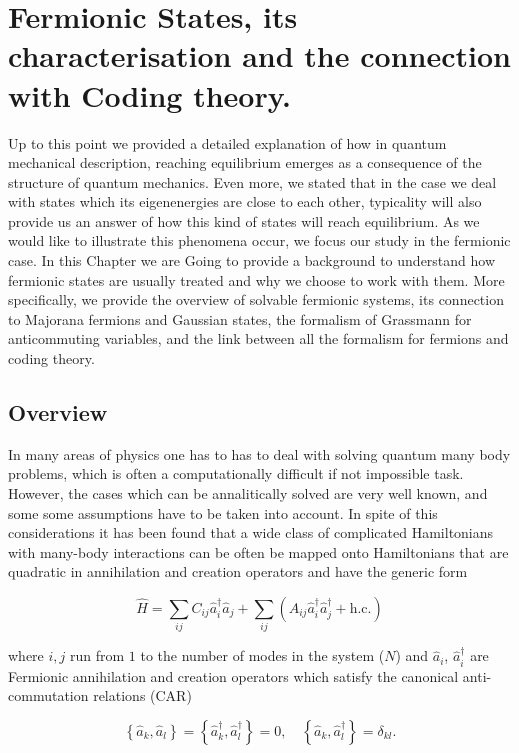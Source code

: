 \chapter{ Fermionic States, its characterisation and the connection with Coding theory.}
Up to this point we provided a detailed explanation of how in quantum mechanical description, reaching equilibrium emerges as a consequence of the structure of quantum mechanics. Even more, we stated that in the case we deal with states which its eigenenergies are close to each other, typicality will also provide us an answer of how this kind of states will reach equilibrium. As we would like to illustrate this phenomena occur, we focus our study in the fermionic case. In this Chapter we are Going to provide a background to understand how fermionic states are usually treated and why we choose to work with them. More specifically, we provide the overview of solvable fermionic systems, its connection to Majorana fermions and Gaussian states, the formalism of Grassmann for anticommuting variables, and the link between all the formalism for fermions and coding theory.\\
\section{Overview}
In many areas of physics one has to has to deal with solving quantum many body problems, which is often a computationally difficult if not impossible task. However, the cases which can be annalitically solved are very well known, and some some assumptions have to be taken into account. In spite of this considerations it has been found that a wide class of complicated Hamiltonians with many-body interactions can be often be mapped onto Hamiltonians that are quadratic in annihilation and creation operators and have the generic form \cite{botero_bcs-like_2004}

\begin{equation}
\hat{H}=\sum_{i j} C_{i j} \hat{a}_{i}^{\dagger} \hat{a}_{j}+\sum_{i j}\left(A_{i j} \hat{a}_{i}^{\dagger}\hat{a}_{j}^{\dagger}+\mathrm{h.c.}\right)
\label{CH2:QuadraticHamiltonian}
\end{equation}

where $i,j$ run from $1$ to the number of modes in the system ($N$) and $\hat{a}_i$, $\hat{a}^{\dagger}_i$ are Fermionic annihilation and creation operators which satisfy the canonical anti-commutation relations (CAR)\cite{fradkin_field_1997}

\begin{equation}
\left\{\hat{a}_{k}, \hat{a}_{l}\right\}=\left\{\hat{a}_{k}^{\dagger}, \hat{a}_{l}^{\dagger}\right\}=0, \quad\left\{\hat{a}_{k}, \hat{a}_{l}^{\dagger}\right\}=\delta_{k l}.
\label{CH2:Anticommutation}
\end{equation}


